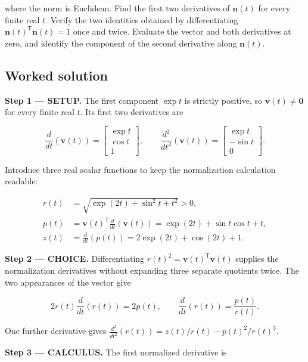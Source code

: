 \documentclass[11pt,oneside,openany]{book}
\begin{document}
where the norm is Euclidean. Find the first two derivatives of \(\mathbf n(t)\) for every finite real \(t\). Verify the two identities obtained by differentiating \(\mathbf n(t)^{\mathsf T}\mathbf n(t)=1\) once and twice. Evaluate the vector and both derivatives at zero, and identify the component of the second derivative along \(\mathbf n(t)\).
\subsection*{Worked solution}

\textbf{Step 1 --- SETUP.} The first component \(\exp t\) is strictly positive, so \(\mathbf v(t)\ne\mathbf0\) for every finite real \(t\). Its first two derivatives are

\[
\frac{d}{dt}\left(\mathbf v(t)\right)
=\begin{bmatrix}\exp t\\\cos t\\1\end{bmatrix},\qquad
\frac{d^2}{dt^2}\left(\mathbf v(t)\right)
=\begin{bmatrix}\exp t\\-\sin t\\0\end{bmatrix}.
\]

Introduce three real scalar functions to keep the normalization calculation readable:

\[
\begin{aligned}
r(t)&=\sqrt{\exp(2t)+\sin^2t+t^2}>0,\\
p(t)&=\mathbf v(t)^{\mathsf T}\frac{d}{dt}\left(\mathbf v(t)\right)
=\exp(2t)+\sin t\cos t+t,\\
z(t)&=\frac{d}{dt}\left(p(t)\right)
=2\exp(2t)+\cos(2t)+1.
\end{aligned}
\]

\begin{ChoiceStep}
\textbf{Step 2 --- CHOICE.} Differentiating \(r(t)^2=\mathbf v(t)^{\mathsf T}\mathbf v(t)\) supplies the normalization derivatives without expanding three separate quotients twice. The two appearances of the vector give

\[
2r(t)\frac{d}{dt}\left(r(t)\right)=2p(t),\qquad
\frac{d}{dt}\left(r(t)\right)=\frac{p(t)}{r(t)}.
\]

One further derivative gives \(\frac{d^2}{dt^2}(r(t))=z(t)/r(t)-p(t)^2/r(t)^3\).

\end{ChoiceStep}
\textbf{Step 3 --- CALCULUS.} The first normalized derivative is
\end{document}
